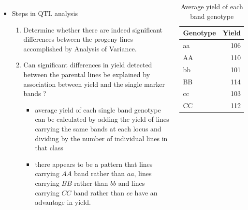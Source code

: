 \documentclass[
  ignorenonframetext,
  aspectratio=169]{beamer}
\providecommand{\tightlist}{%
  \setlength{\itemsep}{0pt}\setlength{\parskip}{0pt}}
\newcommand{\bcolumns}{\begin{columns}[T, onlytextwidth]}
\newcommand{\ecolumns}{\end{columns}}
\begin{document}
\begin{frame}{}
\protect\hypertarget{section-9}{}
\bcolumns
{}
\small

\begin{itemize}
\tightlist
\item
  Steps in QTL analysis

  \begin{enumerate}
  \footnotesize
  \item Determine whether there are indeed significant differences between the progeny lines -- accomplished by Analysis of Variance.
  \item Can significant differences in yield detected between the parental lines be explained by association between yield and the single marker bands ?
    \begin{itemize}
    \footnotesize
    \item average yield of each single band genotype can be calculated by adding the yield of lines carrying the same bands at each locus and dividing by the number of individual lines in that class
    \item there appears to be a pattern that lines carrying $AA$ band rather than $aa$, lines carrying $BB$ rather than $bb$ and lines carrying $CC$ band rather than $cc$ have an advantage in yield.
    \end{itemize}
  \end{enumerate}
\end{itemize}


\renewcommand{\arraystretch}{1}

\begin{table}

\caption{\label{tab:marker-phenotype-data-summary}Average yield of each band genotype}
\centering
\fontsize{6}{8}\selectfont
\begin{tabular}[t]{lr}
\toprule
Genotype & Yield\\
\midrule
aa & 106\\
AA & 110\\
bb & 101\\
BB & 114\\
cc & 103\\
\addlinespace
CC & 112\\
\bottomrule
\end{tabular}
\end{table}

\ecolumns
\end{frame}
\end{document}
